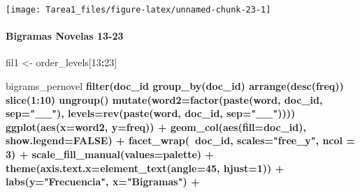 \documentclass[
]{article}
\newenvironment{Shaded}{\begin{snugshade}}{\end{snugshade}}
\newcommand{\DataTypeTok}[1]{\textcolor[rgb]{0.13,0.29,0.53}{#1}}
\newcommand{\DecValTok}[1]{\textcolor[rgb]{0.00,0.00,0.81}{#1}}
\newcommand{\KeywordTok}[1]{\textcolor[rgb]{0.13,0.29,0.53}{\textbf{#1}}}
\newcommand{\NormalTok}[1]{#1}
\newcommand{\OperatorTok}[1]{\textcolor[rgb]{0.81,0.36,0.00}{\textbf{#1}}}
\newcommand{\OtherTok}[1]{\textcolor[rgb]{0.56,0.35,0.01}{#1}}
\newcommand{\StringTok}[1]{\textcolor[rgb]{0.31,0.60,0.02}{#1}}
\begin{document}
\texttt{[image: Tarea1\_files/figure-latex/unnamed-chunk-23-1]}

\hypertarget{bigramas-novelas-13-23}{%
\paragraph{\texorpdfstring{\textbf{Bigramas Novelas
13-23}}{Bigramas Novelas 13-23}}\label{bigramas-novelas-13-23}}

\begin{Shaded}
\begin{Highlighting}[]
\NormalTok{fil1 <-}\StringTok{ }\NormalTok{order_levels[}\DecValTok{13}\OperatorTok{:}\DecValTok{23}\NormalTok{]}

\NormalTok{bigrams_pernovel }\OperatorTok{%
\StringTok{  }\KeywordTok{filter}\NormalTok{(doc_id }\OperatorTok{%
\StringTok{  }\KeywordTok{group_by}\NormalTok{(doc_id) }\OperatorTok{%
\StringTok{  }\KeywordTok{arrange}\NormalTok{(}\KeywordTok{desc}\NormalTok{(freq)) }\OperatorTok{%
\StringTok{  }\KeywordTok{slice}\NormalTok{(}\DecValTok{1}\OperatorTok{:}\DecValTok{10}\NormalTok{) }\OperatorTok{%
\StringTok{  }\KeywordTok{ungroup}\NormalTok{() }\OperatorTok{%
\StringTok{  }\KeywordTok{mutate}\NormalTok{(}\DataTypeTok{word2=}\KeywordTok{factor}\NormalTok{(}\KeywordTok{paste}\NormalTok{(word, doc_id, }\DataTypeTok{sep=}\StringTok{"__"}\NormalTok{), }
                      \DataTypeTok{levels=}\KeywordTok{rev}\NormalTok{(}\KeywordTok{paste}\NormalTok{(word, doc_id, }\DataTypeTok{sep=}\StringTok{"__"}\NormalTok{))))}\OperatorTok{%
\StringTok{  }\KeywordTok{ggplot}\NormalTok{(}\KeywordTok{aes}\NormalTok{(}\DataTypeTok{x=}\NormalTok{word2, }\DataTypeTok{y=}\NormalTok{freq)) }\OperatorTok{+}
\StringTok{  }\KeywordTok{geom_col}\NormalTok{(}\KeywordTok{aes}\NormalTok{(}\DataTypeTok{fill=}\NormalTok{doc_id), }\DataTypeTok{show.legend=}\OtherTok{FALSE}\NormalTok{) }\OperatorTok{+}
\StringTok{  }\KeywordTok{facet_wrap}\NormalTok{(}\OperatorTok{~}\NormalTok{doc_id, }\DataTypeTok{scales=}\StringTok{"free_y"}\NormalTok{, }\DataTypeTok{ncol =} \DecValTok{3}\NormalTok{) }\OperatorTok{+}
\StringTok{  }\KeywordTok{scale_fill_manual}\NormalTok{(}\DataTypeTok{values=}\NormalTok{palette) }\OperatorTok{+}
\StringTok{  }\KeywordTok{theme}\NormalTok{(}\DataTypeTok{axis.text.x=}\KeywordTok{element_text}\NormalTok{(}\DataTypeTok{angle=}\DecValTok{45}\NormalTok{, }\DataTypeTok{hjust=}\DecValTok{1}\NormalTok{)) }\OperatorTok{+}
\StringTok{  }\KeywordTok{labs}\NormalTok{(}\DataTypeTok{y=}\StringTok{"Frecuencia"}\NormalTok{, }\DataTypeTok{x=}\StringTok{"Bigramas"}\NormalTok{) }\OperatorTok{+}
}}}}}}}
\end{Highlighting}
\end{Shaded}
\end{document}
